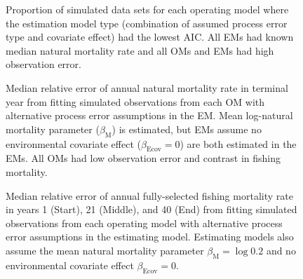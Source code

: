 \documentclass[
  12pt,
]{article}
\begin{document}
\begin{landscape}
\begin{figure}
\begin{center}
\end{center}
\caption{Proportion of simulated data sets for each operating model where the estimation model type (combination of assumed process error type and covariate effect) had the lowest AIC. All EMs had known median natural mortality rate and all OMs and EMs had high observation error.}\label{aic_supp3}
\end{figure}
\end{landscape}

\begin{landscape}
\begin{figure}
\caption{Median relative error of annual natural mortality rate in terminal year from fitting simulated observations from each OM with alternative process error assumptions in the EM. Mean log-natural mortality parameter ($\beta_\text{M}$) is estimated, but EMs assume no environmental covariate effect ($\beta_\text{Ecov} = 0 $) are both estimated in the EMs. All OMs had low observation error and contrast in fishing mortality.}\label{terminal_M_bias_beta_0}
\begin{center}
\end{center}
\end{figure}
\end{landscape}

\begin{landscape}
\begin{figure}
\caption{Median relative error of annual fully-selected fishing mortality rate in years 1 (Start), 21 (Middle), and 40 (End) from fitting simulated observations from each operating model with alternative process error assumptions in the estimating model. Estimating models also assume the mean natural mortality parameter $\beta_\text{M} = \log 0.2$ and no environmental covariate effect $\beta_\text{Ecov} = 0$.}\label{F_bias_M_fixed_beta_fixed}
\begin{center}
\end{center}
\end{figure}
\end{landscape}
\end{document}
